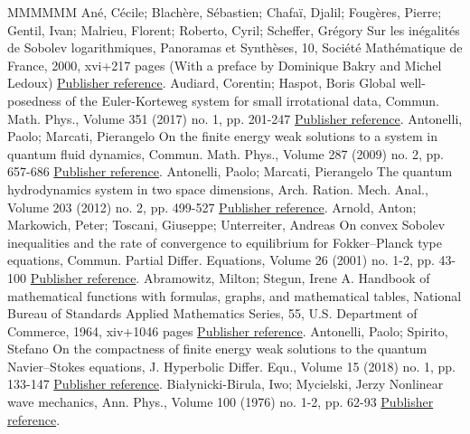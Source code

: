 \begin{thebibliography}{MMMMMM}
 Ané, Cécile; Blachère, Sébastien; Chafaï, Djalil; Fougères, Pierre; Gentil, Ivan; Malrieu, Florent; Roberto, Cyril; Scheffer, Grégory Sur les inégalités de Sobolev logarithmiques, Panoramas et Synthèses, 10, Société Mathématique de France, 2000, xvi+217 pages (With a preface by Dominique Bakry and Michel Ledoux) \href{https://ahl.centre-mersenne.org/item/AHL_2018__1__47_0/#LogSob}{Publisher reference}.
 Audiard, Corentin; Haspot, Boris Global well-posedness of the Euler-Korteweg system for small irrotational data, Commun. Math. Phys., Volume 351 (2017) no. 1, pp. 201-247 \href{https://ahl.centre-mersenne.org/item/AHL_2018__1__47_0/#AuHa17}{Publisher reference}.
 Antonelli, Paolo; Marcati, Pierangelo On the finite energy weak solutions to a system in quantum fluid dynamics, Commun. Math. Phys., Volume 287 (2009) no. 2, pp. 657-686 \href{https://ahl.centre-mersenne.org/item/AHL_2018__1__47_0/#AnMa09}{Publisher reference}.
 Antonelli, Paolo; Marcati, Pierangelo The quantum hydrodynamics system in two space dimensions, Arch. Ration. Mech. Anal., Volume 203 (2012) no. 2, pp. 499-527 \href{https://ahl.centre-mersenne.org/item/AHL_2018__1__47_0/#AnMa12}{Publisher reference}.
 Arnold, Anton; Markowich, Peter; Toscani, Giuseppe; Unterreiter, Andreas On convex Sobolev inequalities and the rate of convergence to equilibrium for Fokker–Planck type equations, Commun. Partial Differ. Equations, Volume 26 (2001) no. 1-2, pp. 43-100 \href{https://ahl.centre-mersenne.org/item/AHL_2018__1__47_0/#AMTU01}{Publisher reference}.
 Abramowitz, Milton; Stegun, Irene A. Handbook of mathematical functions with formulas, graphs, and mathematical tables, National Bureau of Standards Applied Mathematics Series, 55, U.S. Department of Commerce, 1964, xiv+1046 pages \href{https://ahl.centre-mersenne.org/item/AHL_2018__1__47_0/#AbSt64}{Publisher reference}.
 Antonelli, Paolo; Spirito, Stefano On the compactness of finite energy weak solutions to the quantum Navier–Stokes equations, J. Hyperbolic Differ. Equ., Volume 15 (2018) no. 1, pp. 133-147 \href{https://ahl.centre-mersenne.org/item/AHL_2018__1__47_0/#AS-comp}{Publisher reference}.
 Białynicki-Birula, Iwo; Mycielski, Jerzy Nonlinear wave mechanics, Ann. Phys., Volume 100 (1976) no. 1-2, pp. 62-93 \href{https://ahl.centre-mersenne.org/item/AHL_2018__1__47_0/#BiMy76}{Publisher reference}.

\end{thebibliography}
